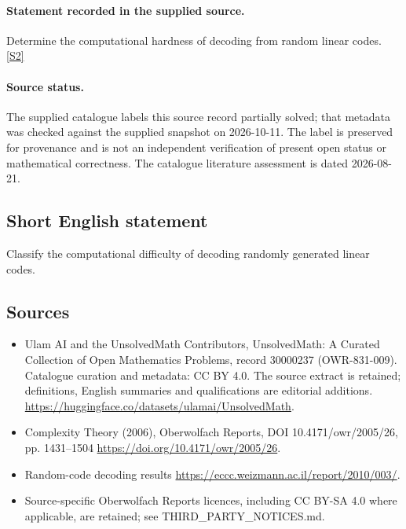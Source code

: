 \documentclass[11pt]{article}
\begin{document}
\paragraph{Statement recorded in the supplied source.}
Determine the computational hardness of decoding from random linear codes. \href{https://doi.org/10.4171/owr/2005/26}{[S2]}
\paragraph{Source status.}
The supplied catalogue labels this source record partially solved; that metadata was checked against the supplied snapshot on 2026-10-11. The label is preserved for provenance and is not an independent verification of present open status or mathematical correctness. The catalogue literature assessment is dated 2026-08-21.
\subsection{Short English statement}
Classify the computational difficulty of decoding randomly generated linear codes.
\subsection{Sources}
\begin{itemize}
\item[S1] Ulam AI and the UnsolvedMath Contributors, UnsolvedMath: A Curated Collection of Open Mathematics Problems, record 30000237 (OWR-831-009). Catalogue curation and metadata: CC BY 4.0. The source extract is retained; definitions, English summaries and qualifications are editorial additions.
\url{https://huggingface.co/datasets/ulamai/UnsolvedMath}.
\item[S2] Complexity Theory (2006), Oberwolfach Reports, DOI 10.4171/owr/2005/26, pp. 1431--1504
\url{https://doi.org/10.4171/owr/2005/26}.
\item[S3] Random-code decoding results
\url{https://eccc.weizmann.ac.il/report/2010/003/}.
\item Source-specific Oberwolfach Reports licences, including CC BY-SA 4.0 where applicable, are retained; see THIRD\_PARTY\_NOTICES.md.
\end{itemize}
\end{document}
